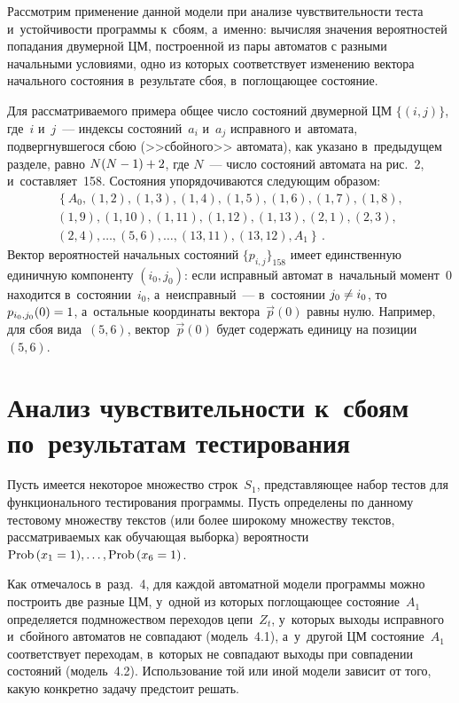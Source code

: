 \begin{multicols}{2}
     Рассмотрим применение данной модели при анализе чувствительности 
теста и~устойчивости программы к~сбоям, а~именно: вычисляя значения 
вероятностей попадания двумерной ЦМ, построенной из пары 
автоматов с разными начальными условиями, одно из которых соответствует 
изменению вектора начального состояния в~результате сбоя, в~поглощающее 
состояние. 
     
     Для рассматриваемого примера общее число состояний двумерной 
ЦМ $\{(i, j)\}$, где~$i$ и~$j$~--- индексы состояний~$a_i$ и~$a_j$ 
исправного и~автомата, подвергнувшегося сбою (>>сбойного>> автомата), как 
указано в~предыдущем разделе, равно $N(N\hm-1)\hm+2$, где $N$~--- число 
состояний автомата на рис.~2, и~составляет~158. Состояния упорядочиваются 
следующим образом:
     \begin{multline*}
\left\{ 
A_0, (1,2), (1, 3), (1, 4), (1, 5), (1, 6), (1, 7), (1, 8),\right.\\
(1, 9), (1, 10), (1, 11), (1, 12), (1, 13), 
(2,1), (2, 3),\\
 \left. (2, 4), \ldots, (5, 6), \ldots, (13, 11), (13, 12), A_1\right\}\,.
\end{multline*}
     Вектор вероятностей начальных состояний $\{p_{i,j}\}_{158}$ имеет 
единственную единичную компоненту $(i_0, j_0)$: если исправный автомат 
в~начальный момент~0 находится в~состоянии~$i_0$, а~неисправный~--- 
в~состоянии $j_0\hm\not= i_0$, то $p_{i_0,j_0}(0)\hm=1$, а~остальные координаты 
вектора~$\vec{p}(0)$ равны нулю. Например, для сбоя вида~$(5,6)$, 
вектор~$\vec{p}(0)$ будет содержать единицу на позиции~$(5,6)$.
     
\section{Анализ чувствительности к~сбоям по~результатам 
тестирования}

     Пусть имеется некоторое множество строк~$S_1$, представляющее 
набор тестов для функционального тестирования программы. Пусть 
определены по данному тестовому множеству текстов (или более широкому 
множеству текстов, рассматриваемых как обучающая выборка) вероятности 
$\mathrm{Prob}\,(x_1\hm=1), \ldots, \mathrm{Prob}\,(x_6\hm=1)$.
     
     Как отмечалось в~разд.~4, для каждой автоматной модели программы 
можно построить две разные ЦМ, у~одной из которых поглощающее 
состояние~$A_1$ определяется подмножеством переходов цепи~$Z_t$, 
у~которых выходы исправного и~сбойного автоматов не совпадают 
(модель~4.1), а~у~другой ЦМ состояние~$A_1$ соответствует 
переходам, в~которых не совпадают выходы при совпадении состояний 
(модель~4.2). Использование той или иной модели зависит от того, какую 
конкретно задачу предстоит решать.
     

\end{multicols}
